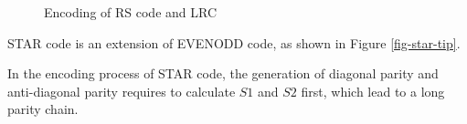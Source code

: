 \documentclass[sigconf]{acmart}
\begin{document}
\begin{figure}
\vspace{-3mm}
\caption{Encoding of RS code and LRC}
\vspace{-3mm}
\end{figure}

STAR code \cite{STAR} is an extension of EVENODD \cite{EVENODD} code, as shown in Figure \ref{fig-star-tip}.

In the encoding process of STAR code, the generation of diagonal parity and anti-diagonal parity requires to calculate $S1$ and $S2$ first, which lead to a long parity chain.
\end{document}
